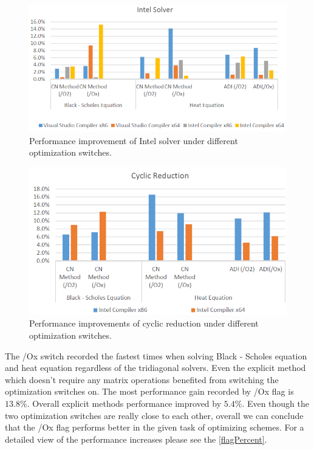 \documentclass[12pt, oneside]{book}
\theoremstyle{plain}
\theoremstyle{definition}
\begin{document}
\begin{figure}[!htb]
    \label{intelBar}
    \centering
        \includegraphics[scale=0.6]{intelFlagBar.png}
    \caption{Performance improvement of Intel solver under different optimization switches.}
\end{figure} 

\begin{figure}[!htb]
    \label{cyclicBar}
    \centering
        \includegraphics[scale=0.6]{cyclicFlagBar.png}
    \caption{Performance improvements of cyclic reduction under different optimization switches.}
\end{figure}

The /Ox switch recorded the fastest times when solving Black - Scholes equation and heat equation regardless of the tridiagonal solvers. Even the explicit method which doesn't require any matrix operations benefited from switching the optimization switches on. The most performance gain recorded by /Ox flag is $13.8 \%$. Overall explicit methods performance improved by $5.4 \%$. Even though the two optimization switches are really close to each other, overall we can conclude that the /Ox flag performs better in the given task  of optimizing schemes. For a detailed view of the performance increases please see the \ref{flagPercent}.
\end{document}
